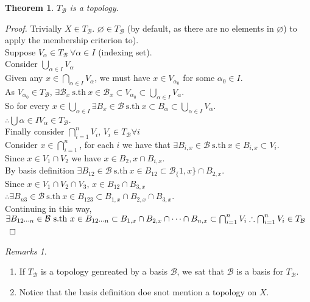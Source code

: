 \documentclass{article}
\let\ddd\cdots
\newcommand{\sth}{\mathrm{s.th}\ }
\renewcommand{\emptyset}{\varnothing}
\newcommand{\ba}{\mathcal{B}}
\newtheorem{stheorem}{Theorem}[theorem]
\theoremstyle{remark}
\theoremstyle{example}
\theoremstyle{examples}
\newtheorem*{remarks}{Remarks}
\begin{document}
	\begin{stheorem}
		$T_\ba$ is a topology.
	\end{stheorem}
	\begin{proof}
		Trivially $X \in T_\ba$. $\emptyset \in T_\ba$ (by default, as there are no elements in $\emptyset$) to apply the membership criterion to).\\
		Suppose $V_\alpha \in T_\ba\ \forall \alpha \in I$ (indexing set).\\
		Consider $\bigcup_{\alpha \in I} V_\alpha$\\
		Given any $x \in \bigcap_{\alpha \in I} V_\alpha$, we must have $x \in V_{\alpha_0}$ for some $\alpha_0 \in I$.\\
		As $V_{\alpha_0} \in T_\ba$, $\exists \ba_x\ \sth x \in \ba_x \subset V_{\alpha_0} \subset \bigcup_{\alpha \in I} V_\alpha$.\\
		So for every $x \in \bigcup_{\alpha \in I} \exists B_x \in \ba\ \sth x \subset B_\alpha \subset \bigcup_{\alpha \in I} V_\alpha$.\\
		$\therefore \bigcup{\alpha \in I} V_\alpha \in T_\ba$.\\
		Finally consider $\bigcap_{i=1}^n V_i$, $V_i \in T_\ba \forall i$\\
		Consider $x \in \bigcap_{i=1}^n$, for each $i$ we have that $\exists B_{i,x} \in \ba\ \sth x \in B_{i,x} \subset V_i$.\\
		Since $x \in V_1 \cap V_2$ we have $x \in B_2, x \cap B_{i,x}$.\\
		By basis definition $\exists B_{12} \in \ba \ \sth x \in B_{12}\subset \ba_\{1,x\} \cap B_{2,x}$.\\
		Since $x \in V_1 \cap V_2 \cap V_3$, $x \in B_{12} \cap B_{3,x}$\\
		$\therefore \exists B_{n3} \in \ba\ \sth x \in B_{123} \subset B_{1,x} \cap B_{2,x} \cap B_{3,x}$.\\
		Continuing in this way, $\exists B_{12\ddd n} \in \ba\ \sth x \in B_{12\ddd n}\subset B_{1,x} \cap B_{2,x} \cap \ddd \cap B_{n,x} \subset \bigcap_{i=1}^n V_i\\
		\therefore \bigcap_{i=1}^n V_i \in T_\ba$
	\end{proof}

	\begin{remarks}
		\begin{enumerate}
			\item If $T_\ba$ is a topology genreated by a basis $\ba$, we sat that $\ba$ is a basis for $T_\ba$.
			\item Notice that the basis definition doe snot mention a topology on $X$.
		\end{enumerate}
	\end{remarks}
\end{document}
